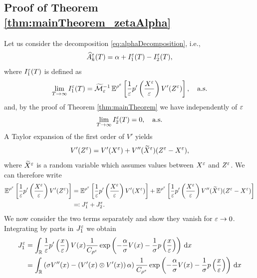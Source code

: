 \documentclass[10pt]{article}
\begin{document}
\begin{appendices}
\subsection{Proof of Theorem \ref{thm:mainTheorem_zetaAlpha}}
	Let us consider the decomposition \eqref{eq:alphaDecomposition}, i.e.,
	\begin{equation}
	\widehat A_k^\varepsilon(T) = \alpha + I_1^\varepsilon(T) - I_2^\varepsilon(T),
	\end{equation}
	where $I_1^\varepsilon(T)$ is defined as
	\begin{equation}
		\lim_{T \to \infty} I_1^\varepsilon(T) = \widetilde {\mathcal M}_\varepsilon^{-1} \operatorname{\mathbb{E}}^{\rho^\varepsilon} \left [ \frac{1}{\varepsilon} p' \left ( \frac{X^\varepsilon}{\varepsilon} \right ) V'(Z^\varepsilon) \right ], \quad \text{a.s.}
	\end{equation}
	and, by the proof of Theorem \ref{thm:mainTheorem} we have independently of $\varepsilon$
	\begin{equation}
		\lim_{T \to \infty} I_2^\varepsilon(T) = 0, \quad \text{a.s.}
	\end{equation}
	A Taylor expansion of the first order of $V'$ yields
	\begin{equation}
	V'(Z^\varepsilon) = V'(X^\varepsilon) + V''(\widetilde X^\varepsilon) (Z^\varepsilon - X^\varepsilon),
	\end{equation}
	where $\widetilde X^\varepsilon$ is a random variable which assumes values between $X^\varepsilon$ and $Z^\varepsilon$. We can therefore write
	\begin{equation}
	\begin{aligned}
	\operatorname{\mathbb{E}}^{\rho^\varepsilon} \left [ \frac{1}{\varepsilon} p' \left ( \frac{X^\varepsilon}{\varepsilon} \right ) V'(Z^\varepsilon) \right ] &= \operatorname{\mathbb{E}}^{\rho^\varepsilon} \left [ \frac{1}{\varepsilon} p' \left ( \frac{X^\varepsilon}{\varepsilon} \right ) V'(X^\varepsilon) \right ] + \operatorname{\mathbb{E}}^{\rho^\varepsilon} \left [ \frac{1}{\varepsilon} p' \left ( \frac{X^\varepsilon}{\varepsilon} \right ) V''(\widetilde X^\varepsilon) (Z^\varepsilon - X^\varepsilon) \right ] \\
	&\eqqcolon J_1^\varepsilon + J_2^\varepsilon.
	\end{aligned}
	\end{equation}
	We now consider the two terms separately and show they vanish for $\varepsilon \to 0$. Integrating by parts in $J_1^\varepsilon$ we obtain
	\begin{equation}
	\begin{aligned}
	J_1^\epl &= \int_\R \frac{1}{\epl} p' \left( \frac{x}{\epl} \right) V(x) \frac{1}{C_{\rho^\epl}} \exp \left( -\frac\alpha\sigma V(x) - \frac1\sigma p\left(\frac{x}{\epl}\right) \right) \dd x \\
	&= \int_\R \left ( \sigma V''(x) -  \left(V'(x) \otimes V'(x)\right) \alpha \right) \frac{1}{C_{\rho^\epl}} \exp \left( -\frac\alpha\sigma V(x) - \frac1\sigma p\left(\frac{x}{\epl}\right) \right) \dd x \\

\end{aligned}
\end{equation}
\end{appendices}
\end{document}
